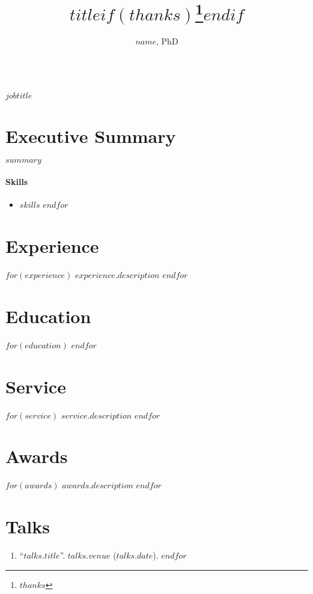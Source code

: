 \documentclass[11pt]{article}
\title{$title$$if(thanks)$\thanks{$thanks$}$endif$}
\author{$name$, PhD}
\date{}
\makeatletter
\renewcommand\maketitle{
    {\noindent\Large\sffamily\bfseries \@author\\
		\large\normalfont\itshape $jobtitle$}
  }
\makeatother
\begin{document}
\maketitle
\thispagestyle{empty}

\section{Executive Summary}
\noindent $summary$
\paragraph{Skills} \begin{multicols}{3}
	\begin{itemize}
		$for(skills)$
		\item $skills$
		$endfor$
	\end{itemize}
\end{multicols}
\titlerule

\section*{Experience}
$for(experience)$
$experience.description$
$endfor$

\section*{Education}
$for(education)$
$endfor$

\section*{Service}
$for(service)$
$service.description$
$endfor$

\section*{Awards}
$for(awards)$
$awards.description$
$endfor$

\section*{Talks}
\begin{enumerate}
$for(talks)$
\item ``\href{$talks.link$}{$talks.title$}''. $talks.venue$ ($talks.date$).
$endfor$
\end{enumerate}
\end{document}
